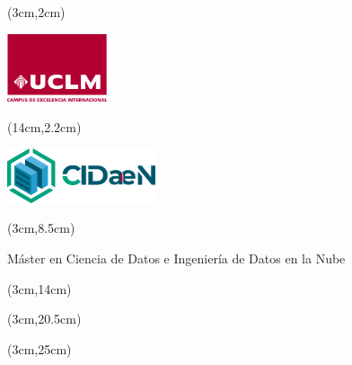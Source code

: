 %
% 
\pagestyle{empty}
\begin{titlepage}\null
\begin{textblock*}{3cm}(3cm,2cm) 
\begin{flushleft}
\includegraphics[height=2cm]{figs/logouclm.png}
\end{flushleft}
\end{textblock*}



\begin{textblock*}{2cm}(14cm,2.2cm)  %
\begin{flushright}
\includegraphics[height=1.6cm]{figs/CIDaeN.png}
\end{flushright}
\end{textblock*}



\begin{textblock*}{\textwidth}(3cm,8.5cm) 
\begin{center}\doublespacing 
{\fontsize{18pt}{4pt}\selectfont {}}

\bigskip
{\fontsize{18pt}{4pt}\selectfont Máster en Ciencia de Datos e Ingeniería de Datos en la Nube }


\end{center}
\end{textblock*}


\begin{textblock*}{\textwidth}(3cm,14cm) 
\begin{center} 
{\fontsize{22pt}{4pt}\selectfont \bft{\titulo}}
\end{center}
\end{textblock*}


\begin{textblock*}{\textwidth}(3cm,20.5cm) 
\begin{flushleft}\doublespacing
{\fontsize{14pt}{4pt}\selectfont {} \autor}

{\fontsize{14pt}{4pt}\selectfont {} \director}

\end{flushleft}
\end{textblock*}


\begin{textblock*}{\linewidth}(3cm,25cm) 
\begin{flushright}
{\fontsize{14pt}{4pt}\selectfont \fecha}
\end{flushright}
\end{textblock*}
\end{titlepage}